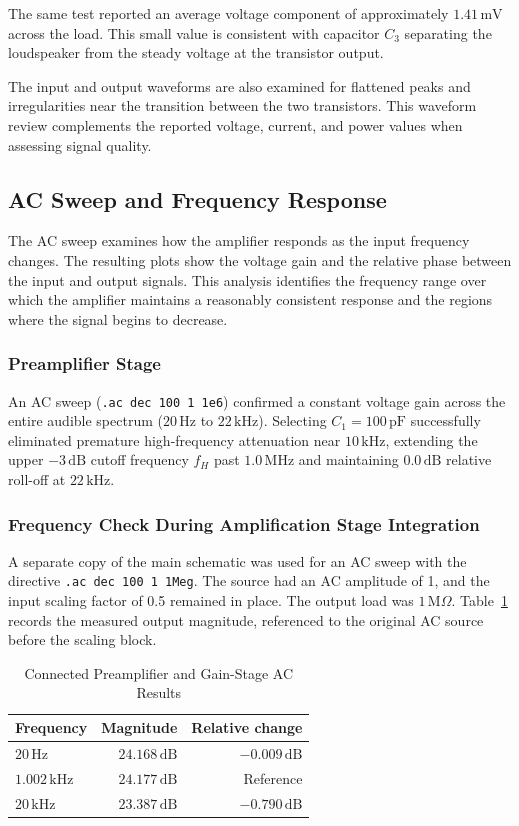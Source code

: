 \documentclass[conference]{IEEEtran}
\begin{document}
The same test reported an average voltage component of approximately $1.41\,\mathrm{mV}$ across the load. This small value is consistent with capacitor $C_3$ separating the loudspeaker from the steady voltage at the transistor output.

The input and output waveforms are also examined for flattened peaks and irregularities near the transition between the two transistors. This waveform review complements the reported voltage, current, and power values when assessing signal quality.

\subsection{AC Sweep and Frequency Response}
The AC sweep examines how the amplifier responds as the input frequency changes. The resulting plots show the voltage gain and the relative phase between the input and output signals. This analysis identifies the frequency range over which the amplifier maintains a reasonably consistent response and the regions where the signal begins to decrease.

\subsubsection{Preamplifier Stage}
An AC sweep (\texttt{.ac dec 100 1 1e6}) confirmed a constant voltage gain across the entire audible spectrum ($20\,\mathrm{Hz}$ to $22\,\mathrm{kHz}$). Selecting $C_1 = 100\,\mathrm{pF}$ successfully eliminated premature high-frequency attenuation near $10\,\mathrm{kHz}$, extending the upper $-3\,\mathrm{dB}$ cutoff frequency $f_H$ past $1.0\,\mathrm{MHz}$ and maintaining $0.0\,\mathrm{dB}$ relative roll-off at $22\,\mathrm{kHz}$.

\subsubsection{Frequency Check During Amplification Stage Integration}
A separate copy of the main schematic was used for an AC sweep with the directive \texttt{.ac dec 100 1 1Meg}. The source had an AC amplitude of 1, and the input scaling factor of 0.5 remained in place. The output load was $1\,\mathrm{M}\Omega$. Table~\ref{tab:amplification_ac} records the measured output magnitude, referenced to the original AC source before the scaling block.

\begin{table}[H]
\caption{Connected Preamplifier and Gain-Stage AC Results}
\label{tab:amplification_ac}
\centering
\begin{tabular}{lrr}
\toprule
Frequency & Magnitude & Relative change \\
\midrule
$20\,\mathrm{Hz}$ & $24.168\,\mathrm{dB}$ & $-0.009\,\mathrm{dB}$ \\
$1.002\,\mathrm{kHz}$ & $24.177\,\mathrm{dB}$ & Reference \\
$20\,\mathrm{kHz}$ & $23.387\,\mathrm{dB}$ & $-0.790\,\mathrm{dB}$ \\
\bottomrule
\end{tabular}
\end{table}
\end{document}
